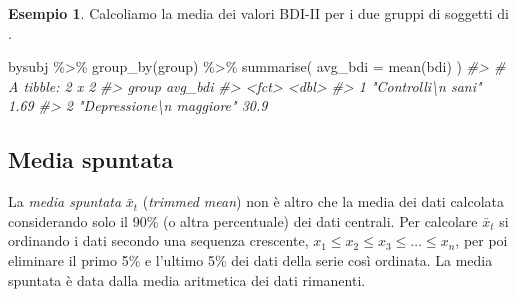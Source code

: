 \documentclass[
  10pt,
  italian,
  a4paper,
  extrafontsizes,onecolumn,openright
  ]{memoir}
\newenvironment{Shaded}{\begin{snugshade}}{\end{snugshade}}
\newcommand{\AttributeTok}[1]{\textcolor[rgb]{0.77,0.63,0.00}{#1}}
\newcommand{\CommentTok}[1]{\textcolor[rgb]{0.56,0.35,0.01}{\textit{#1}}}
\newcommand{\FunctionTok}[1]{\textcolor[rgb]{0.00,0.00,0.00}{#1}}
\newcommand{\NormalTok}[1]{#1}
\newcommand{\SpecialCharTok}[1]{\textcolor[rgb]{0.00,0.00,0.00}{#1}}
\theoremstyle{definition}
\theoremstyle{definition}
\newtheorem{example}{Esempio}[chapter]
\theoremstyle{definition}
\theoremstyle{definition}
\theoremstyle{remark}
\begin{document}
\begin{example}

Calcoliamo la media dei valori BDI-II per i due gruppi di soggetti di \textcite{zetschefuture2019}.

\begin{Shaded}
\begin{Highlighting}[]
\NormalTok{bysubj }\SpecialCharTok{\%\textgreater{}\%}
  \FunctionTok{group\_by}\NormalTok{(group) }\SpecialCharTok{\%\textgreater{}\%}
  \FunctionTok{summarise}\NormalTok{(}
    \AttributeTok{avg\_bdi =} \FunctionTok{mean}\NormalTok{(bdi)}
\NormalTok{  )}
\CommentTok{\#\textgreater{} \# A tibble: 2 x 2}
\CommentTok{\#\textgreater{}   group                    avg\_bdi}
\CommentTok{\#\textgreater{}   \textless{}fct\textgreater{}                      \textless{}dbl\textgreater{}}
\CommentTok{\#\textgreater{} 1 "Controlli\textbackslash{}n sani"          1.69}
\CommentTok{\#\textgreater{} 2 "Depressione\textbackslash{}n maggiore"   30.9}
\end{Highlighting}
\end{Shaded}

\end{example}

\hypertarget{media-spuntata}{%
\subsection{Media spuntata}\label{media-spuntata}}

La \emph{media spuntata} \(\bar{x}_t\) (\emph{trimmed mean}) non è altro che la
media dei dati calcolata considerando solo il 90\% (o altra percentuale)
dei dati centrali. Per calcolare \(\bar{x}_t\) si ordinando i dati secondo
una sequenza crescente, \(x_1 \leq x_2 \leq x_3 \leq \dots \leq x_n\), per
poi eliminare il primo 5\% e l'ultimo 5\% dei dati della serie così
ordinata. La media spuntata è data dalla media aritmetica dei dati rimanenti.
\end{document}
